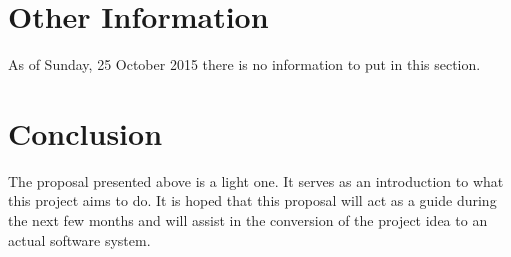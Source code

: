 \documentclass[12pt,svgnames,smaller]{article} %
\begin{document}

\section{ \textbf{ Other Information } } 

As of Sunday, 25 October 2015 there is no information to put in this section.



\section{ \textbf{ Conclusion } } 

The proposal presented above is a light one. It serves as an introduction to what this project aims to do. It is hoped that this proposal will act as a guide during the next few months and will assist in the conversion of the project idea to an actual software system.


\end{document}
